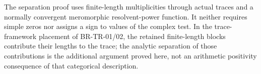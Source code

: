 The separation proof uses finite-length multiplicities
through actual traces and a normally convergent
meromorphic resolvent-power function.  It neither
requires simple zeros nor assigns a sign to values
of the complex test.  In the trace-framework placement
of BR-TR-01/02, the retained finite-length blocks
contribute their lengths to the trace; the analytic
separation of those contributions is the additional
argument proved here, not an arithmetic positivity
consequence of that categorical description.
